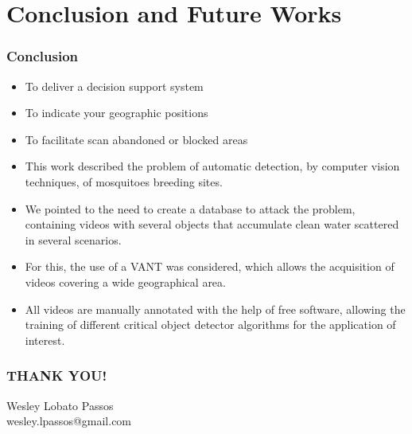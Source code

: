 \documentclass{beamer}
\begin{document}
	\section{Conclusion and Future Works}

		\begin{frame}
			\frametitle{Conclusion}
			\begin{itemize}
				\item To deliver a decision support system
				\item To indicate your geographic positions
				\item To facilitate scan abandoned or blocked areas
			\end{itemize}

		\begin{itemize}
			\item This work described the problem of automatic detection, by computer vision techniques, of mosquitoes breeding sites.
			\item We pointed to the need to create a database to attack the problem, containing videos with several objects that accumulate clean water scattered in several scenarios.
			\item For this, the use of a VANT was considered, which allows the acquisition of videos covering a wide geographical area.
			\item All videos are manually annotated with the help of free software, allowing the training of different critical object detector algorithms for the application of interest.
		\end{itemize}

		\end{frame}

		\begin{frame}
			\frametitle{THANK YOU!}
			\centering
			Wesley Lobato Passos\\
			wesley.lpassos@gmail.com
		\end{frame}
\end{document}
